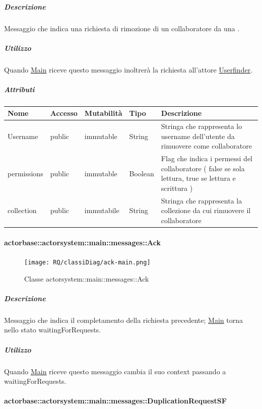 \documentclass{scalatekids-article}
\begin{document}
\subparagraph{Descrizione}

Messaggio che indica una richiesta di rimozione di un collaboratore da una
.

\subparagraph{Utilizzo}

Quando \hyperref[sec:actorbase::actorsystem::main::Main]{Main}
riceve questo messaggio inoltrerà la richiesta all'attore \hyperref[sec:actorbase::actorsystem::userfinder::Userfinder]{Userfinder}.

\subparagraph{Attributi}
\begin{tabular}{| p{3cm} | p{1.5cm} | p{2cm} | p{2cm} | p{8.5cm} |}
  \hline
  Nome & Accesso & Mutabilità & Tipo & Descrizione\\
  \hline
  Username & public & immutable & String & Stringa che rappresenta lo username dell'utente da rimuovere come collaboratore\\
  \hline
  permissions & public & immutable & Boolean & Flag che indica i permessi del collaboratore ( false se sola lettura, true se lettura e scrittura )\\
  \hline
  collection & public & immutabile & String & Stringa che rappresenta la collezione da cui rimuovere il collaboratore\\
  \hline
\end{tabular}

\paragraph{actorbase::actorsystem::main::messages::Ack}
\label{sec:actorbase::actorsystem::main::messages::Ack}

\begin{figure}[H]
   \begin{center}
     \texttt{[image: RQ/classiDiag/ack-main.png]}
     \caption{Classe actorsystem::main::messages::Ack}
   \end{center}
 \end{figure}

\subparagraph{Descrizione}

Messaggio che indica il completamento della richiesta precedente; \hyperref[sec:actorbase::actorsystem::main::Main]{Main} torna nello stato waitingForRequests.

\subparagraph{Utilizzo}

Quando \hyperref[sec:actorbase::actorsystem::main::Main]{Main}
riceve questo messaggio cambia il suo context passando a waitingForRequests.

\paragraph{actorbase::actorsystem::main::messages::DuplicationRequestSF}
\label{sec:actorbase::actorsystem::main::messages::DuplicateRequestSF}
\end{document}
